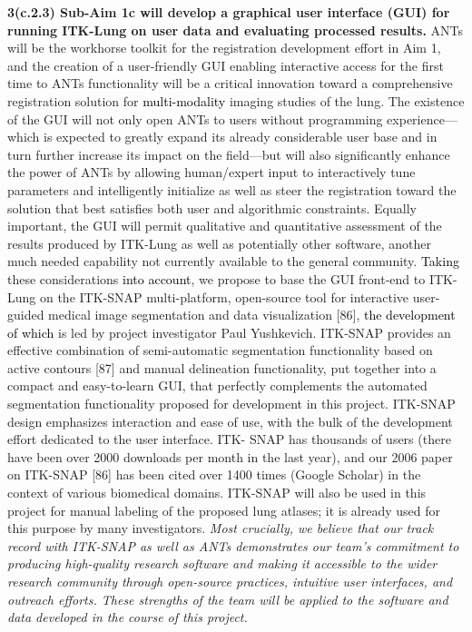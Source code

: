 \documentclass[11pt,]{article}
\begin{document}
\textbf{3(c.2.3) Sub-Aim 1c will develop a graphical user interface
(GUI) for running ITK-Lung on user data and evaluating processed
results.} ANTs will be the workhorse toolkit for the registration
development effort in Aim 1, and the creation of a user-friendly GUI
enabling interactive access for the first time to ANTs functionality
will be a critical innovation toward a comprehensive registration
solution for \textcolor{black}{multi-modality} imaging studies of the
lung. The existence of the GUI will not only open ANTs to users without
programming experience---which is expected to greatly expand its already
considerable user base and in turn further increase its impact on the
field---but will also significantly enhance the power of ANTs by
allowing human/expert input to interactively tune parameters and
intelligently initialize as well as steer the registration toward the
solution that best satisfies both user and algorithmic constraints.
Equally important, the GUI will permit qualitative and quantitative
assessment of the results produced by ITK-Lung as well as potentially
other software, another much needed capability not currently available
to the general community. \textcolor{black}{Taking} these considerations
\textcolor{black}{into account}, we propose to base the GUI front-end to
ITK-Lung on the ITK-SNAP multi-platform, open-source tool for
interactive user-guided medical image segmentation and data
visualization {[}86{]}, \textcolor{black}{the development of which} is
led by project investigator Paul Yushkevich. ITK-SNAP provides an
effective combination of semi-automatic segmentation functionality based
on active contours {[}87{]} and manual delineation functionality, put
together into a compact and easy-to-learn GUI, that perfectly
complements the automated segmentation functionality proposed for
development in this project. ITK-SNAP design emphasizes interaction and
ease of use, with the bulk of the development effort dedicated to the
user interface. ITK- SNAP has thousands of users (there have been over
2000 downloads per month in the last year), and our 2006 paper on
ITK-SNAP {[}86{]} has been cited over 1400 times (Google Scholar) in the
context of various biomedical domains. ITK-SNAP will also be used in
this project for manual labeling of the proposed lung atlases; it is
already used for this purpose by many investigators. \emph{Most
crucially, we believe that our track record with ITK-SNAP as well as
ANTs demonstrates our team's commitment to producing high-quality
research software and making it accessible to the wider research
community through open-source practices, intuitive user interfaces, and
outreach efforts. These strengths of the team will be applied to the
software and data developed in the course of this project.}
\end{document}
